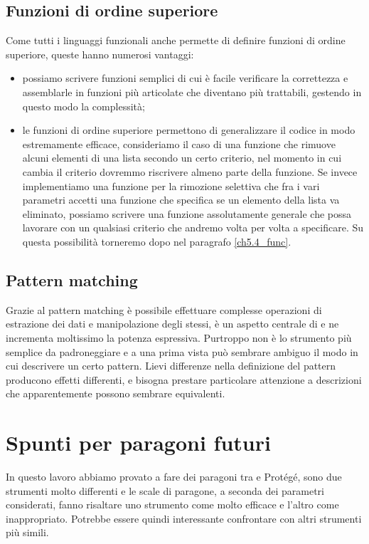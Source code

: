 \subsection{Funzioni di ordine superiore}
Come tutti i linguaggi funzionali anche \cduce permette di definire funzioni di ordine superiore, queste hanno numerosi vantaggi: 
\begin{itemize}
	\item possiamo scrivere funzioni semplici di cui è facile verificare la correttezza e assemblarle in funzioni più articolate che diventano più trattabili, gestendo in questo modo la complessità;
	\item le funzioni di ordine superiore permettono di generalizzare il codice in modo estremamente efficace, consideriamo il caso di una funzione che rimuove alcuni elementi di una lista secondo un certo criterio, nel momento in cui cambia il criterio dovremmo riscrivere almeno parte della funzione. Se invece implementiamo una funzione per la rimozione selettiva che fra i vari parametri accetti una funzione che specifica se un elemento della lista va eliminato, possiamo scrivere una funzione assolutamente generale che possa lavorare con un qualsiasi criterio che andremo volta per volta a specificare. Su questa possibilità torneremo dopo nel paragrafo \ref{ch5.4_func}.
\end{itemize}
\subsection{Pattern matching}
Grazie al pattern matching è possibile effettuare complesse operazioni di estrazione dei dati e manipolazione degli stessi, è un aspetto centrale di \cduce e ne incrementa moltissimo la potenza espressiva. Purtroppo non è lo strumento più semplice da padroneggiare e a una prima vista può sembrare ambiguo il modo in cui descrivere un certo pattern. Lievi differenze nella definizione del pattern producono effetti differenti, e bisogna prestare particolare attenzione a descrizioni che apparentemente possono sembrare equivalenti.
\section{Spunti per paragoni futuri}
In questo lavoro abbiamo provato a fare dei paragoni tra \cduce e Protégé, sono due strumenti molto differenti e le scale di paragone, a seconda dei parametri considerati, fanno risaltare uno strumento come molto efficace e l'altro come inappropriato. Potrebbe essere quindi interessante confrontare \cduce con altri strumenti più simili.
